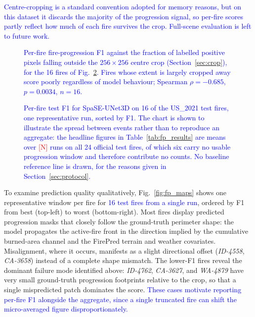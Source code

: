 \documentclass[sensors,article,submit,moreauthors,pdftex]{Definitions/mdpi}
\newcommand{\rev}[1]{\textcolor{blue}{#1}}
\newcommand{\nseedFP}{\textcolor{red}{[N]}}
\begin{document}
\rev{Centre-cropping is a standard convention adopted for memory reasons, but on
this dataset it discards the majority of the progression signal, so per-fire
scores partly reflect how much of each fire survives the crop. Full-scene
evaluation is left to future work.}

\begin{figure}[H]
\centering

\caption{\rev{Per-fire fire-progression F1 against the fraction of labelled
positive pixels falling outside the $256 \times 256$ centre crop
(Section~\ref{sec:crop}), for the 16 fires of Fig.~\ref{fig:fp_per_fire}. Fires
whose extent is largely cropped away score poorly regardless of model
behaviour; Spearman $\rho = -0.685$, $p = 0.0034$, $n = 16$.}}
\label{fig:fp_crop}
\end{figure}

\begin{figure}[H]
\centering

\caption{\rev{Per-fire test F1 for SpaSE-UNet3D on 16 of the US\_2021 test
fires, one representative run, sorted by F1. The chart is shown to illustrate
the spread between events rather than to reproduce an aggregate: the headline
figures in Table~\ref{tab:fp_results} are means over \nseedFP{} runs on all 24
official test fires, of which six carry no usable progression window and
therefore contribute no counts. No baseline reference line is drawn, for the
reasons given in Section~\ref{sec:protocol}.}}
\label{fig:fp_per_fire}
\end{figure}

To examine prediction quality qualitatively, Fig.~\ref{fig:fp_maps} shows one representative window per fire for \rev{16 test fires from a single run}, ordered by F1 from best (top-left) to worst (bottom-right). Most fires display predicted progression masks that closely follow the ground-truth perimeter shape: the model propagates the active-fire front in the direction implied by the cumulative burned-area channel and the FirePred terrain and weather covariates. Misalignment, where it occurs, manifests as a slight directional offset (\textit{ID-4558}, \textit{CA-3658}) instead of a complete shape mismatch. The lower-F1 fires reveal the dominant failure mode identified above: \textit{ID-4762}, \textit{CA-3627}, and \textit{WA-4879} have very small ground-truth progression footprints relative to the crop, so that a single mispredicted patch dominates the score. \rev{These cases motivate reporting per-fire F1 alongside the aggregate, since a single truncated fire can shift the micro-averaged figure disproportionately.}
\end{document}
